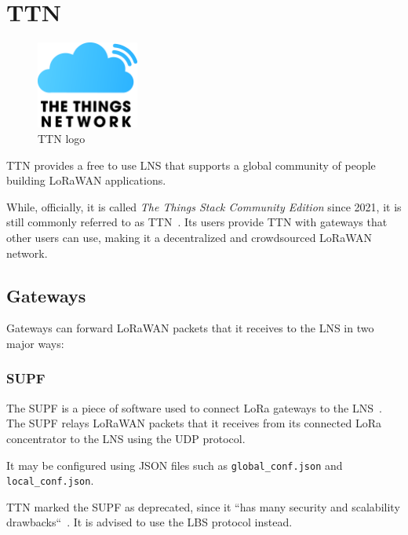 \section{\acf{TTN}}

\begin{figure}
    \centering
    \includegraphics[width=0.3\textwidth]{pictures/logos/TTN-logo.eps}
    \caption{\acf{TTN} logo~\protect\cite{the_things_industries_bv_quick_nodate}}
\end{figure}

\ac{TTN} provides a free to use \ac{LNS} that supports a global community of people building \ac{LoRaWAN} applications.

While, officially, it is called \emph{The Things Stack Community Edition} since 2021, it is still commonly referred to as \acf{TTN}~\cite{the_things_industries_bv_what_2022}.
Its users provide \ac{TTN} with gateways that other users can use, making it a decentralized and crowdsourced \ac{LoRaWAN} network.

\subsection{Gateways}

Gateways can forward \ac{LoRaWAN} packets that it receives to the \ac{LNS} in two major ways:

\subsubsection{\acf{SUPF}}

The \acl{SUPF} is a piece of software used to connect \ac{LoRa} gateways to the \ac{LNS}~\cite{the_things_industries_bv_semtech_2022}.
The \ac{SUPF} relays \ac{LoRaWAN} packets that it receives from its connected \ac{LoRa} concentrator to the \ac{LNS} using the \ac{UDP} protocol.

It may be configured using JSON files such as \lstinline{global_conf.json} and \lstinline{local_conf.json}.

\ac{TTN} marked the \acl{SUPF} as deprecated, since it ``has many security and scalability drawbacks``~\cite{the_things_industries_bv_semtech_2022}.
It is advised to use the \acl{LBS} protocol instead.

